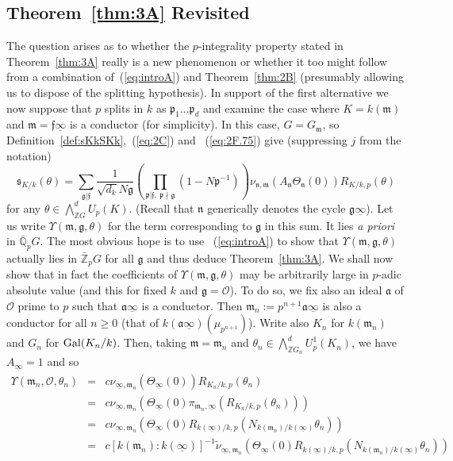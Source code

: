 \documentclass[12pt]{article}
\newcounter{rem}[section]%
\newcommand{\barbbQ}{\ensuremath{\bar{\bbQ}}}
\newcommand{\bbQ}{\ensuremath{\mathbb{Q}}}
\newcommand{\bbZ}{\ensuremath{\mathbb{Z}}}
\newcommand{\cO}{\ensuremath{\mathcal{O}}}
\newcommand{\fa}{\ensuremath{\mathfrak{a}}}
\newcommand{\ff}{\ensuremath{\mathfrak{f}}}
\newcommand{\fg}{\ensuremath{\mathfrak{g}}}
\newcommand{\fm}{\ensuremath{\mathfrak{m}}}
\newcommand{\fn}{\ensuremath{\mathfrak{n}}}
\newcommand{\fp}{\ensuremath{\mathfrak{p}}}
\newcommand{\fs}{\ensuremath{\mathfrak{s}}}
\newcommand{\Gal}{{\rm Gal}}
\newcommand{\inv}{^{-1}}%
\newcommand{\ndiv}{\nmid}
\newcommand{\refeq}[1]{~(\ref{eq:#1})}
\newcommand{\rem}{\refstepcounter{rem}\noindent{\sc Remark \therem}}%
\renewcommand{\therem}{\thesection.\arabic{rem}}
\newcommand{\uinf}{\ensuremath{{\underline{\infty}}}}
\begin{document}
\subsection{Theorem~\ref{thm:3A} Revisited}\label{subsec:thm3arev}
The question arises as to whether
the $p$-integrality property stated in Theorem~\ref{thm:3A} really is a new
phenomenon or whether it too might follow from a combination of\refeq{introA}
and Theorem~\ref{thm:2B} (presumably allowing us to dispose of the
splitting hypothesis). In support of the first alternative we now suppose that
$p$ splits in $k$ as $\fp_1\ldots\fp_d$ and examine
the case where $K=k(\fm)$ and $\fm=\ff\uinf$
is a conductor (for simplicity). In this case,
$G=G_\fm$, so Definition~\ref{def:sKkSKk},\refeq{2C} and
\refeq{2F.75} give (suppressing $j$ from the notation)
\[
\fs_{K/k}(\theta)=
\sum_{\fg|\ff}\frac{1}{\sqrt{d_k}N\fg}
  \left(\prod_{\fp|\ff,\ \fp\ndiv\fg}(1-N\fp\inv)\right)
  \nu_{\fn,\fm}(A_{\fn}\Theta_{\fn}(0))R_{K/k,p}(\theta)
\]
for any $\theta\in \bigwedge_{\bbZ G}^d U_p(K)$. (Recall that $\fn$ generically
denotes the cycle $\fg\uinf$).
Let us write $\Upsilon(\fm,\fg,\theta)$ for the term corresponding to $\fg$ in this
sum. It lies \emph{a priori} in $\barbbQ_p G$.
The most obvious hope is to use
\refeq{introA} to show that $\Upsilon(\fm,\fg,\theta)$ actually lies in
$\bar{\bbZ}_p G$ for all $\fg$ and thus deduce Theorem~\ref{thm:3A}.
We shall now show that in fact the
coefficients of $\Upsilon(\fm,\fg,\theta)$ may be arbitrarily large in $p$-adic
absolute value (and this for fixed $k$ and $\fg=\cO$). To do so, we fix also
an ideal $\fa$ of $\cO$ prime to $p$ such that $\fa\uinf$ is a conductor. Then $\fm_n:=p^{n+1}\fa\uinf$
is also a conductor for all $n\geq 0$ (that of $k(\fa\uinf)(\mu_{p^{n+1}})$). Write also
$K_n$ for $k(\fm_n)$ and $G_n$ for $\Gal(K_n/k)$. Then, taking $\fm=\fm_n$ and
$\theta_n\in\bigwedge_{\bbZ G_n}^d U^1_p(K_n)$, we have $A_\uinf=1$ and so
\begin{eqnarray*}
\Upsilon(\fm_n,\cO,\theta_n)&=&c\nu_{\uinf,\fm_n}(\Theta_{\uinf}(0))R_{K_n/k,p}(\theta_n)\\
                          &=&c\nu_{\uinf,\fm_n}\left(\Theta_{\uinf}(0)\pi_{\fm_n,\uinf}
                               (R_{K_n/k,p}(\theta_n))\right)\\
                          &=&c\nu_{\uinf,\fm_n}\left(\Theta_{\uinf}(0)
                              R_{k(\uinf)/k,p}(N_{k(\fm_n)/k(\uinf)}\theta_n)\right)\\
                            &=&c[k(\fm_n):k(\uinf)]\inv
                            \tilde{\nu}_{\uinf,\fm_n}\left(\Theta_{\uinf}(0)
                              R_{k(\uinf)/k,p}(N_{k(\fm_n)/k(\uinf)}\theta_n)\right)
\end{eqnarray*}
\end{document}
